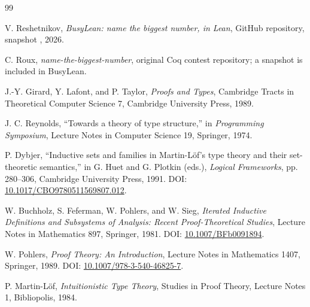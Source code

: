 \documentclass[11pt,oneside]{article}
\theoremstyle{definition}
\newcommand{\BusyLean}{\textsf{BusyLean}}
\begin{document}
\begin{thebibliography}{99}

V. Reshetnikov,
\emph{BusyLean: name the biggest number, in Lean},
GitHub repository, snapshot
, 2026.

C. Roux,
\emph{name-the-biggest-number},
original Coq contest repository; a snapshot is included in \BusyLean{}.

J.-Y. Girard, Y. Lafont, and P. Taylor,
\emph{Proofs and Types},
Cambridge Tracts in Theoretical Computer Science 7,
Cambridge University Press, 1989.

J. C. Reynolds,
``Towards a theory of type structure,''
in \emph{Programming Symposium}, Lecture Notes in Computer Science 19,
Springer, 1974.

P. Dybjer,
``Inductive sets and families in Martin-Löf's type theory and their
set-theoretic semantics,''
in G. Huet and G. Plotkin (eds.),
\emph{Logical Frameworks}, pp. 280--306,
Cambridge University Press, 1991.
DOI: \href{https://doi.org/10.1017/CBO9780511569807.012}
{10.1017/CBO9780511569807.012}.

W. Buchholz, S. Feferman, W. Pohlers, and W. Sieg,
\emph{Iterated Inductive Definitions and Subsystems of Analysis:
Recent Proof-Theoretical Studies},
Lecture Notes in Mathematics 897, Springer, 1981.
DOI: \href{https://doi.org/10.1007/BFb0091894}{10.1007/BFb0091894}.

W. Pohlers,
\emph{Proof Theory: An Introduction},
Lecture Notes in Mathematics 1407, Springer, 1989.
DOI: \href{https://doi.org/10.1007/978-3-540-46825-7}
{10.1007/978-3-540-46825-7}.

P. Martin-Löf,
\emph{Intuitionistic Type Theory},
Studies in Proof Theory, Lecture Notes 1, Bibliopolis, 1984.

\end{thebibliography}
\end{document}
